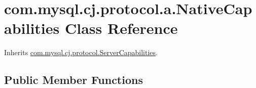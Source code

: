 \hypertarget{classcom_1_1mysql_1_1cj_1_1protocol_1_1a_1_1_native_capabilities}{}\section{com.\+mysql.\+cj.\+protocol.\+a.\+Native\+Capabilities Class Reference}
\label{classcom_1_1mysql_1_1cj_1_1protocol_1_1a_1_1_native_capabilities}


Inherits \mbox{\hyperlink{interfacecom_1_1mysql_1_1cj_1_1protocol_1_1_server_capabilities}{com.\+mysql.\+cj.\+protocol.\+Server\+Capabilities}}.

\subsection*{Public Member Functions}
